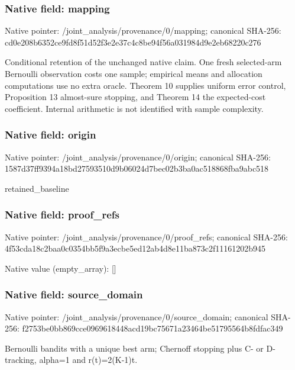 \documentclass[10pt,a4paper]{article}
\begin{document}
\subsubsection{Native field: mapping}
Native pointer: /joint\_\allowbreak{}analysis/provenance/0/mapping; canonical SHA-256: cd0e208b6352ce9fd8f51d52f3e2e37c4c8be94f56a031984d9e2eb68220c276

\begingroup\raggedright\sloppy Conditional retention of the unchanged native claim. One fresh selected-arm Bernoulli observation costs one sample;\allowbreak{} empirical means and allocation computations use no extra oracle. Theorem 10 supplies uniform error control,\allowbreak{} Proposition 13 almost-sure stopping,\allowbreak{} and Theorem 14 the expected-cost coefficient. Internal arithmetic is not identified with sample complexity.\par\endgroup

\subsubsection{Native field: origin}
Native pointer: /joint\_\allowbreak{}analysis/provenance/0/origin; canonical SHA-256: 1587d37ff9394a18bd27593510d9b06024d7bec02b3ba0ac518868fba9abc518

\begingroup\raggedright\sloppy retained\_\allowbreak{}baseline\par\endgroup

\subsubsection{Native field: proof\_\allowbreak{}refs}
Native pointer: /joint\_\allowbreak{}analysis/provenance/0/proof\_\allowbreak{}refs; canonical SHA-256: 4f53cda18c2baa0c0354bb5f9a3ecbe5ed12ab4d8e11ba873c2f11161202b945

Native value (empty\_\allowbreak{}array): []

\subsubsection{Native field: source\_\allowbreak{}domain}
Native pointer: /joint\_\allowbreak{}analysis/provenance/0/source\_\allowbreak{}domain; canonical SHA-256: f2753be0bb869cce0969618448acd19bc75671a23464be51795564b8fdfac349

\begingroup\raggedright\sloppy Bernoulli bandits with a unique best arm;\allowbreak{} Chernoff stopping plus C- or D-tracking,\allowbreak{} alpha=\allowbreak{}1 and r(t)=\allowbreak{}2(K-1)t.\par\endgroup
\end{document}
